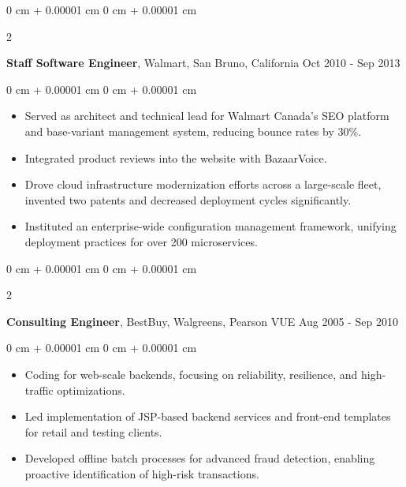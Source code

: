 \documentclass[10pt, letterpaper]{article}
\newenvironment{highlights}{
    \begin{itemize}[
        topsep=0.20 cm,     %
        parsep=0.20 cm,     %
        partopsep=0pt,
        itemsep=0.15cm,     %
        leftmargin=0 cm + 10pt
    ]
}{
    \end{itemize}
} %
\newenvironment{onecolentry}{
    \begin{adjustwidth}{
        0 cm + 0.00001 cm
    }{
        0 cm + 0.00001 cm
    }
}{
    \end{adjustwidth}
} %
\newenvironment{twocolentry}[2][]{
    \onecolentry
    \def\secondColumn{#2}
    \setcolumnwidth{\fill, 4.5 cm}
    \begin{paracol}{2}
}{
    \switchcolumn \raggedleft \secondColumn
    \end{paracol}
    \endonecolentry
} %
\begin{document}
        \vspace{0.40 cm} %
        \begin{twocolentry}{
            Oct 2010 - Sep 2013
        }
            \textbf{Staff Software Engineer}, Walmart, San Bruno, California\end{twocolentry}
        \vspace{0.20 cm} %
        \begin{onecolentry}
            \begin{highlights}
                \item Served as architect and technical lead for Walmart Canada's SEO platform and base-variant management system, reducing bounce rates by 30\%.
                \item Integrated product reviews into the website with BazaarVoice.
                \item Drove cloud infrastructure modernization efforts across a large-scale fleet, invented two patents and decreased deployment cycles significantly.
                \item Instituted an enterprise-wide configuration management framework, unifying deployment practices for over 200 microservices.
            \end{highlights}
        \end{onecolentry}

        \vspace{0.40 cm} %
        \begin{twocolentry}{
            Aug 2005 - Sep 2010
        }
            \textbf{Consulting Engineer}, BestBuy, Walgreens, Pearson VUE\end{twocolentry}
        \vspace{0.20 cm} %
        \begin{onecolentry}
            \begin{highlights}
                \item Coding for web-scale backends, focusing on reliability, resilience, and high-traffic optimizations.
                \item Led implementation of JSP-based backend services and front-end templates for retail and testing clients.
                \item Developed offline batch processes for advanced fraud detection, enabling proactive identification of high-risk transactions.
            \end{highlights}
        \end{onecolentry}
\end{document}
